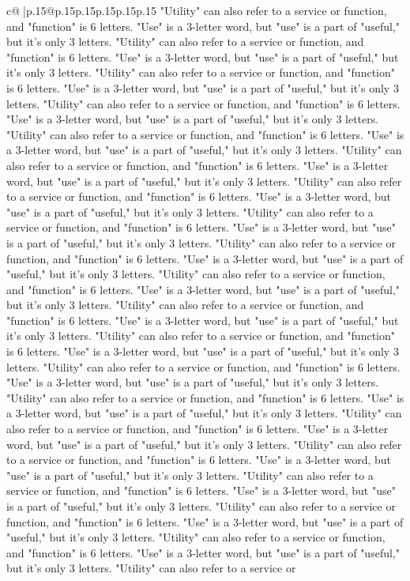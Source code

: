 \documentclass{article}
\begin{document}
{\begin{supertabular}{c@{$\;$}|p{.15\linewidth}@{}p{.15\linewidth}p{.15\linewidth}p{.15\linewidth}p{.15\linewidth}p{.15\linewidth}}
{{{"Utility" can also refer to a service or function, and "function" is 6 letters. "Use" is a 3{-}letter word, but "use" is a part of "useful," but it's only 3 letters. "Utility" can also refer to a service or function, and "function" is 6 letters. "Use" is a 3{-}letter word, but "use" is a part of "useful," but it's only 3 letters. "Utility" can also refer to a service or function, and "function" is 6 letters. "Use" is a 3{-}letter word, but "use" is a part of "useful," but it's only 3 letters. "Utility" can also refer to a service or function, and "function" is 6 letters. "Use" is a 3{-}letter word, but "use" is a part of "useful," but it's only 3 letters. "Utility" can also refer to a service or function, and "function" is 6 letters. "Use" is a 3{-}letter word, but "use" is a part of "useful," but it's only 3 letters. "Utility" can also refer to a service or function, and "function" is 6 letters. "Use" is a 3{-}letter word, but "use" is a part of "useful," but it's only 3 letters. "Utility" can also refer to a service or function, and "function" is 6 letters. "Use" is a 3{-}letter word, but "use" is a part of "useful," but it's only 3 letters. "Utility" can also refer to a service or function, and "function" is 6 letters. "Use" is a 3{-}letter word, but "use" is a part of "useful," but it's only 3 letters. "Utility" can also refer to a service or function, and "function" is 6 letters. "Use" is a 3{-}letter word, but "use" is a part of "useful," but it's only 3 letters. "Utility" can also refer to a service or function, and "function" is 6 letters. "Use" is a 3{-}letter word, but "use" is a part of "useful," but it's only 3 letters. "Utility" can also refer to a service or function, and "function" is 6 letters. "Use" is a 3{-}letter word, but "use" is a part of "useful," but it's only 3 letters. "Utility" can also refer to a service or function, and "function" is 6 letters. "Use" is a 3{-}letter word, but "use" is a part of "useful," but it's only 3 letters. "Utility" can also refer to a service or function, and "function" is 6 letters. "Use" is a 3{-}letter word, but "use" is a part of "useful," but it's only 3 letters. "Utility" can also refer to a service or function, and "function" is 6 letters. "Use" is a 3{-}letter word, but "use" is a part of "useful," but it's only 3 letters. "Utility" can also refer to a service or function, and "function" is 6 letters. "Use" is a 3{-}letter word, but "use" is a part of "useful," but it's only 3 letters. "Utility" can also refer to a service or function, and "function" is 6 letters. "Use" is a 3{-}letter word, but "use" is a part of "useful," but it's only 3 letters. "Utility" can also refer to a service or function, and "function" is 6 letters. "Use" is a 3{-}letter word, but "use" is a part of "useful," but it's only 3 letters. "Utility" can also refer to a service or function, and "function" is 6 letters. "Use" is a 3{-}letter word, but "use" is a part of "useful," but it's only 3 letters. "Utility" can also refer to a service or function, and "function" is 6 letters. "Use" is a 3{-}letter word, but "use" is a part of "useful," but it's only 3 letters. "Utility" can also refer to a service or }}}
\end{supertabular}}
\end{document}
